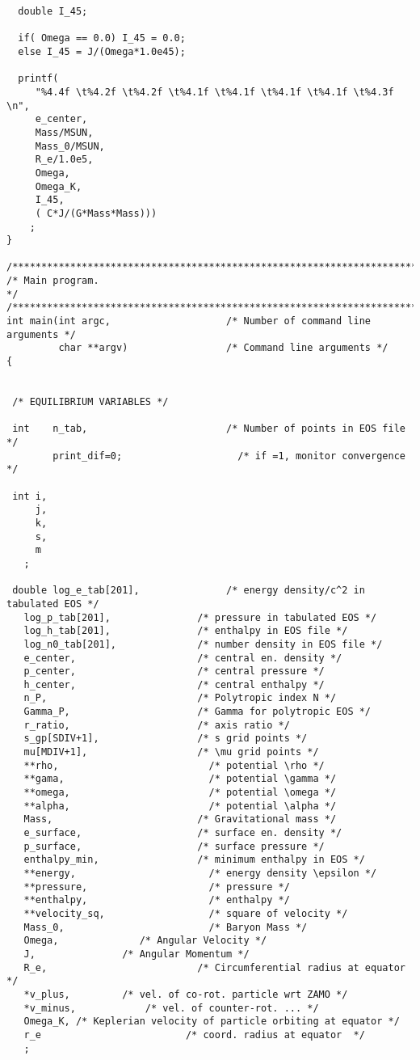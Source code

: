 \begin{verbatim}
  double I_45;
  
  if( Omega == 0.0) I_45 = 0.0;
  else I_45 = J/(Omega*1.0e45);

  printf(
	 "%4.4f \t%4.2f \t%4.2f \t%4.1f \t%4.1f \t%4.1f \t%4.1f \t%4.3f \n",
	 e_center,
	 Mass/MSUN,
	 Mass_0/MSUN,
	 R_e/1.0e5,
	 Omega,
	 Omega_K,
	 I_45,
	 ( C*J/(G*Mass*Mass)))
    ;
}

/*************************************************************************/
/* Main program.                                                         */
/*************************************************************************/
int main(int argc,                    /* Number of command line arguments */ 
         char **argv)                 /* Command line arguments */
{


 /* EQUILIBRIUM VARIABLES */

 int    n_tab,                        /* Number of points in EOS file */
        print_dif=0;                    /* if =1, monitor convergence */

 int i,
     j,
     k,
     s,
     m
   ;

 double log_e_tab[201],               /* energy density/c^2 in tabulated EOS */
   log_p_tab[201],               /* pressure in tabulated EOS */
   log_h_tab[201],               /* enthalpy in EOS file */
   log_n0_tab[201],              /* number density in EOS file */  
   e_center,                     /* central en. density */
   p_center,                     /* central pressure */
   h_center,                     /* central enthalpy */
   n_P,                          /* Polytropic index N */
   Gamma_P,                      /* Gamma for polytropic EOS */     
   r_ratio,                      /* axis ratio */
   s_gp[SDIV+1],                 /* s grid points */
   mu[MDIV+1],                   /* \mu grid points */
   **rho,                          /* potential \rho */ 
   **gama,                         /* potential \gamma */ 
   **omega,                        /* potential \omega */ 
   **alpha,                        /* potential \alpha */ 
   Mass,                         /* Gravitational mass */
   e_surface,                    /* surface en. density */ 
   p_surface,                    /* surface pressure */
   enthalpy_min,                 /* minimum enthalpy in EOS */
   **energy,                       /* energy density \epsilon */
   **pressure,                     /* pressure */ 
   **enthalpy,                     /* enthalpy */
   **velocity_sq,                  /* square of velocity */ 
   Mass_0,                         /* Baryon Mass */
   Omega,			   /* Angular Velocity */
   J,				/* Angular Momentum */
   R_e,                          /* Circumferential radius at equator */
   *v_plus,			/* vel. of co-rot. particle wrt ZAMO */
   *v_minus,			/* vel. of counter-rot. ... */
   Omega_K, /* Keplerian velocity of particle orbiting at equator */
   r_e                         /* coord. radius at equator 	*/
   ;


\end{verbatim}

